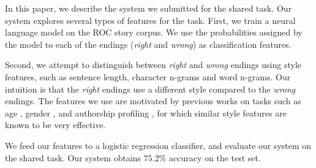 \documentclass[11pt]{article}
\begin{document}
In this paper, we describe the system we submitted for the shared task.
Our system explores several types of features for the task.
First, we train a neural language model \cite{mikolov2010recurrent} on the ROC story corpus. 
We use the probabilities assigned by the model to each of the endings ({\it right} and {\it wrong}) as classification features.

Second, we attempt to distinguish between {\it right} and {\it wrong} endings using style features, such as sentence length, character n-grams and word n-grams. 
Our intuition is that the {\it right} endings use a different style compared to the {\it wrong} endings.
The features we use are motivated by previous works on tasks such as age \cite{Schler:2006}, gender \cite{Argamon:2003}, 
and authorship profiling \cite{Stamatatos:2009}, for which similar style features are known to be very effective.

We feed our features to  a logistic regression classifier, and evaluate our system on the shared task.
Our system obtains $75.2\%$ accuracy on the test set.
\end{document}
